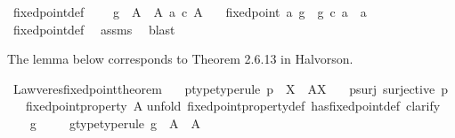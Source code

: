 \begin{isabellebody}
\isanewline
{}\isamarkupfalse%
\ fixed{\isacharunderscore}{\kern0pt}point{\isacharunderscore}{\kern0pt}def{}{\isacharcolon}{\kern0pt}\ \isanewline
\ \ \ {\isachardoublequoteopen}g\ {\isacharcolon}{\kern0pt}\ A\ {\isasymrightarrow}\ A{\isachardoublequoteclose}\ {\isachardoublequoteopen}a\ {\isasymin}\isactrlsub c\ A{\isachardoublequoteclose}\isanewline
\ \ \ {\isachardoublequoteopen}fixed{\isacharunderscore}{\kern0pt}point\ a\ g\ {\isacharequal}{\kern0pt}\ {\isacharparenleft}{\kern0pt}g\ {\isasymcirc}\isactrlsub c\ a\ {\isacharequal}{\kern0pt}\ a{\isacharparenright}{\kern0pt}{\isachardoublequoteclose}\isanewline
%
\isadelimproof
\ \ %
\endisadelimproof
%
\isatagproof
{}\isamarkupfalse%
\ fixed{\isacharunderscore}{\kern0pt}point{\isacharunderscore}{\kern0pt}def\ \isamarkupfalse%
\ assms\ \isamarkupfalse%
\ blast%
\endisatagproof
{\isafoldproof}%
%
\isadelimproof
%
\endisadelimproof
%
\begin{isamarkuptext}%
The lemma below corresponds to Theorem 2.6.13 in Halvorson.%
\end{isamarkuptext}\isamarkuptrue%
\isamarkupfalse%
\ Lawveres{\isacharunderscore}{\kern0pt}fixed{\isacharunderscore}{\kern0pt}point{\isacharunderscore}{\kern0pt}theorem{\isacharcolon}{\kern0pt}\isanewline
\ \ \ p{\isacharunderscore}{\kern0pt}type{\isacharbrackleft}{\kern0pt}type{\isacharunderscore}{\kern0pt}rule{\isacharbrackright}{\kern0pt}{\isacharcolon}{\kern0pt}\ {\isachardoublequoteopen}p\ {\isacharcolon}{\kern0pt}\ X\ {\isasymrightarrow}\ A\isactrlbsup X\isactrlesup {\isachardoublequoteclose}\isanewline
\ \ \ p{\isacharunderscore}{\kern0pt}surj{\isacharcolon}{\kern0pt}\ {\isachardoublequoteopen}surjective\ p{\isachardoublequoteclose}\isanewline
\ \ \ {\isachardoublequoteopen}fixed{\isacharunderscore}{\kern0pt}point{\isacharunderscore}{\kern0pt}property\ A{\isachardoublequoteclose}\isanewline
%
\isadelimproof
%
\endisadelimproof
%
\isatagproof
{}\isamarkupfalse%
{\isacharparenleft}{\kern0pt}unfold\ fixed{\isacharunderscore}{\kern0pt}point{\isacharunderscore}{\kern0pt}property{\isacharunderscore}{\kern0pt}def\ has{\isacharunderscore}{\kern0pt}fixed{\isacharunderscore}{\kern0pt}point{\isacharunderscore}{\kern0pt}def{\isacharcomma}{\kern0pt}\ clarify{\isacharparenright}{\kern0pt}\ \isanewline
\ \ \isamarkupfalse%
\ g\ \isanewline
\ \ \isamarkupfalse%
\ g{\isacharunderscore}{\kern0pt}type{\isacharbrackleft}{\kern0pt}type{\isacharunderscore}{\kern0pt}rule{\isacharbrackright}{\kern0pt}{\isacharcolon}{\kern0pt}\ {\isachardoublequoteopen}g\ {\isacharcolon}{\kern0pt}\ A\ {\isasymrightarrow}\ A{\isachardoublequoteclose}\isanewline

\end{isabellebody}
